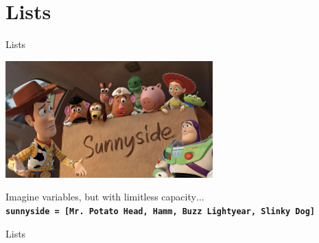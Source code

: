     \section{Lists}
        \begin{frame}{Lists}
            \begin{center}
                \includegraphics[width=0.6\textwidth]{../Lecture1/images/box_many.jpg}                
            \end{center}
            \LARGE
            Imagine variables, but with limitless capacity$\dots$\\
            \textbf{\texttt{sunnyside = [\textquotesingle Mr. Potato Head\textquotesingle, \textquotesingle Hamm\textquotesingle,
            \textquotesingle Buzz Lightyear\textquotesingle, \textquotesingle Slinky Dog\textquotesingle]}}
        \end{frame}

        \begin{frame}{Lists}
            \huge
            \inputminted[frame=single,framesep=2pt]{python3}{../Lecture3/code-examples/intro_lists.py}
            \inputminted[frame=single,framesep=2pt]{python3}{../Lecture3/code-examples/mixed_list.py}
        \end{frame}


